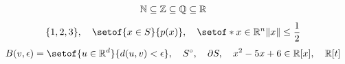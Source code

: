 \documentclass{article}
\begin{document}
\[ \mathbb{N} \subseteq \mathbb{Z} \subseteq \mathbb{Q} \subseteq \mathbb{R} \]
\[ \set{1,2,3}, \quad \setof{x \in S}{p(x)}, \quad \setof*{x \in \R^n}{\norm{x} \le \frac12} \]
\[ \ball{v}{\epsilon} = \setof{u \in \R^d}{\dist{u}{v} < \epsilon}, \quad
   \interior{S}, \quad \bd{S}, \quad x^2 - 5x + 6 \in \Rx, \quad \Rx[t] \]
\end{document}

